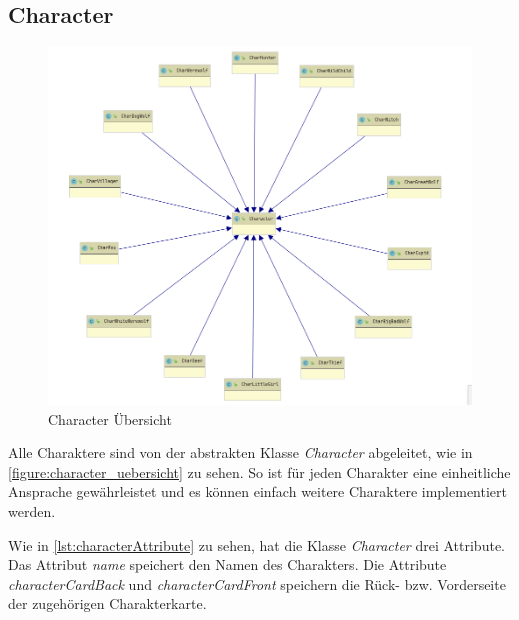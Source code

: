 \subsection{Character}

\begin{figure}[H]
	\centering
	\includegraphics[width=14cm]{architektur/character_uebersicht.png}
	\caption{Character Übersicht}
	\label{figure:character_uebersicht}
\end{figure}

Alle Charaktere sind von der abstrakten Klasse \textit{Character} abgeleitet, wie in \autoref{figure:character_uebersicht} zu sehen. So ist für jeden Charakter eine einheitliche Ansprache gewährleistet und es können einfach weitere Charaktere implementiert werden. 

\medskip
\begin{center}
	\begin{minipage}{0.7\textwidth}
		
	\end{minipage}
\end{center}

Wie in \autoref{lst:characterAttribute} zu sehen, hat die Klasse \textit{Character} drei Attribute. Das Attribut \textit{name} speichert den Namen des Charakters. Die Attribute \textit{characterCardBack} und \textit{characterCardFront} speichern die Rück- bzw. Vorderseite der zugehörigen Charakterkarte. 

